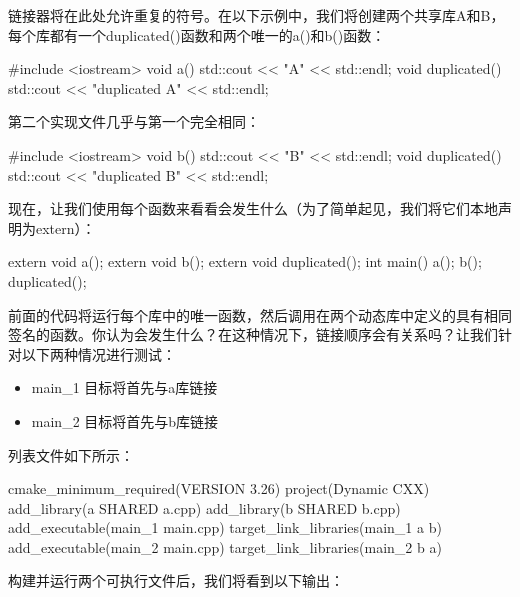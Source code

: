 
链接器将在此处允许重复的符号。在以下示例中，我们将创建两个共享库A和B，每个库都有一个duplicated()函数和两个唯一的a()和b()函数：


\begin{cpp}
#include <iostream>
void a() {
    std::cout << "A" << std::endl;
}
void duplicated() {
    std::cout << "duplicated A" << std::endl;
}
\end{cpp}

第二个实现文件几乎与第一个完全相同：


\begin{cpp}
#include <iostream>
void b() {
    std::cout << "B" << std::endl;
}
void duplicated() {
    std::cout << "duplicated B" << std::endl;
}
\end{cpp}

现在，让我们使用每个函数来看看会发生什么（为了简单起见，我们将它们本地声明为extern）：


\begin{cpp}
extern void a();
extern void b();
extern void duplicated();
int main() {
    a();
    b();
    duplicated();
}
\end{cpp}

前面的代码将运行每个库中的唯一函数，然后调用在两个动态库中定义的具有相同签名的函数。你认为会发生什么？在这种情况下，链接顺序会有关系吗？让我们针对以下两种情况进行测试：

\begin{itemize}
\item
main\_1 目标将首先与a库链接

\item
main\_2 目标将首先与b库链接
\end{itemize}

列表文件如下所示：


\begin{cmake}
cmake_minimum_required(VERSION 3.26)
project(Dynamic CXX)
add_library(a SHARED a.cpp)
add_library(b SHARED b.cpp)
add_executable(main_1 main.cpp)
target_link_libraries(main_1 a b)
add_executable(main_2 main.cpp)
target_link_libraries(main_2 b a)
\end{cmake}

构建并运行两个可执行文件后，我们将看到以下输出：

